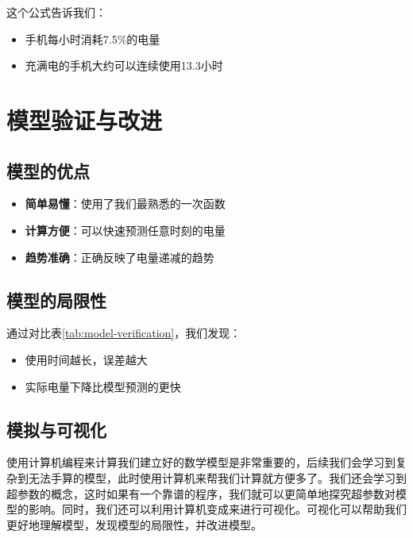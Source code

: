 \begin{successbox}[title=模型解读]
这个公式告诉我们：
\begin{itemize}
    \item 手机每小时消耗7.5\%的电量
    \item 充满电的手机大约可以连续使用13.3小时
\end{itemize}
\end{successbox}

\section{模型验证与改进}\label{sec:model-validation}

\subsection{模型的优点}

\begin{itemize}
    \item \textbf{简单易懂}：使用了我们最熟悉的一次函数
    \item \textbf{计算方便}：可以快速预测任意时刻的电量
    \item \textbf{趋势准确}：正确反映了电量递减的趋势
\end{itemize}

\subsection{模型的局限性}

通过对比表\ref{tab:model-verification}，我们发现：

\begin{itemize}
    \item 使用时间越长，误差越大
    \item 实际电量下降比模型预测的更快
\end{itemize}

\subsection{模拟与可视化}

\begin{warningbox}[title=关于模拟与可视化]
    使用计算机编程来计算我们建立好的数学模型是非常重要的，后续我们会学习到复杂到无法手算的模型，此时使用计算机来帮我们计算就方便多了。我们还会学习到超参数的概念，这时如果有一个靠谱的程序，我们就可以更简单地探究超参数对模型的影响。同时，我们还可以利用计算机变成来进行可视化。可视化可以帮助我们更好地理解模型，发现模型的局限性，并改进模型。
\end{warningbox}


